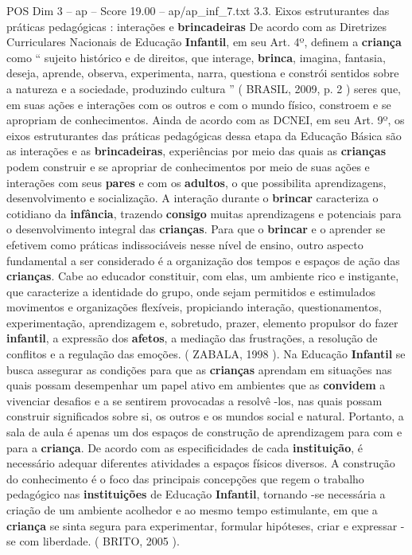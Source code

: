 \begin{textsample}{POS Dim 3 – ap – Score 19.00 – ap/ap\_inf\_7.txt}  \label{ex:f3_pos_185}
3.3.
Eixos estruturantes das práticas pedagógicas : interações e \textbf{brincadeiras} De acordo com as Diretrizes Curriculares Nacionais de Educação \textbf{Infantil}, em seu Art. 4º, definem a \textbf{criança} como “ sujeito histórico e de direitos, que interage, \textbf{brinca}, imagina, fantasia, deseja, aprende, observa, experimenta, narra, questiona e constrói sentidos sobre a natureza e a sociedade, produzindo cultura ” ( BRASIL, 2009, p. 2 ) seres que, em suas ações e interações com os outros e com o mundo físico, constroem e se apropriam de conhecimentos.
Ainda de acordo com as DCNEI, em seu Art. 9º, os eixos estruturantes das práticas pedagógicas dessa etapa da Educação Básica são as interações e as \textbf{brincadeiras}, experiências por meio das quais as \textbf{crianças} podem construir e se apropriar de conhecimentos por meio de suas ações e interações com seus \textbf{pares} e com os \textbf{adultos}, o que possibilita aprendizagens, desenvolvimento e socialização.
A interação durante o \textbf{brincar} caracteriza o cotidiano da \textbf{infância}, trazendo \textbf{consigo} muitas aprendizagens e potenciais para o desenvolvimento integral das \textbf{crianças}.
Para que o \textbf{brincar} e o aprender se efetivem como práticas indissociáveis nesse nível de ensino, outro aspecto fundamental a ser considerado é a organização dos tempos e espaços de ação das \textbf{crianças}.
Cabe ao educador constituir, com elas, um ambiente rico e instigante, que caracterize a identidade do grupo, onde sejam permitidos e estimulados movimentos e organizações flexíveis, propiciando interação, questionamentos, experimentação, aprendizagem e, sobretudo, prazer, elemento propulsor do fazer \textbf{infantil}, a expressão dos \textbf{afetos}, a mediação das frustrações, a resolução de conflitos e a regulação das emoções. ( ZABALA, 1998 ).
Na Educação \textbf{Infantil} se busca assegurar as condições para que as \textbf{crianças} aprendam em situações nas quais possam desempenhar um papel ativo em ambientes que as \textbf{convidem} a vivenciar desafios e a se sentirem provocadas a resolvê -los, nas quais possam construir significados sobre si, os outros e os mundos social e natural.
Portanto, a sala de aula é apenas um dos espaços de construção de aprendizagem para com e para a \textbf{criança}.
De acordo com as especificidades de cada \textbf{instituição}, é necessário adequar diferentes atividades a espaços físicos diversos.
A construção do conhecimento é o foco das principais concepções que regem o trabalho pedagógico nas \textbf{instituições} de Educação \textbf{Infantil}, tornando -se necessária a criação de um ambiente acolhedor e ao mesmo tempo estimulante, em que a \textbf{criança} se sinta segura para experimentar, formular hipóteses, criar e expressar -se com liberdade. ( BRITO, 2005 ).

\end{textsample}

